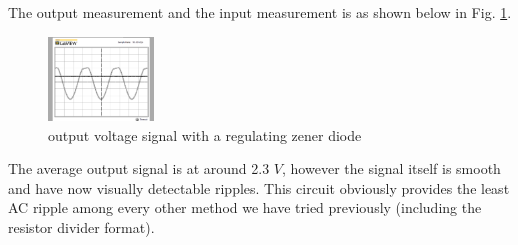 \documentclass[letterpaper, 10 pt, conference]{ieeeconf}  %
\begin{document}
\par The output measurement and the input measurement is as shown below in Fig. \ref{fig:5.4}.
\begin{figure}[ht]
  \centering
  \includegraphics[width=0.25\textwidth]{images/5_4.png}
  \caption{output voltage signal with a regulating zener diode}
  \label{fig:5.4}
\end{figure}
\par The average output signal is at around 2.3 $V$, however the signal itself
is smooth and have now visually detectable ripples. This circuit obviously
provides the least AC ripple among every other method we have tried previously
(including the resistor divider format).
\end{document}
